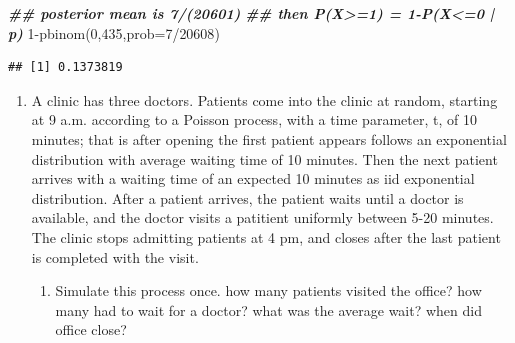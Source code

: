 \documentclass[
]{book}
\newenvironment{Shaded}{\begin{snugshade}}{\end{snugshade}}
\newcommand{\AttributeTok}[1]{\textcolor[rgb]{0.77,0.63,0.00}{#1}}
\newcommand{\DecValTok}[1]{\textcolor[rgb]{0.00,0.00,0.81}{#1}}
\newcommand{\DocumentationTok}[1]{\textcolor[rgb]{0.56,0.35,0.01}{\textbf{\textit{#1}}}}
\newcommand{\FunctionTok}[1]{\textcolor[rgb]{0.00,0.00,0.00}{#1}}
\newcommand{\NormalTok}[1]{#1}
\newcommand{\SpecialCharTok}[1]{\textcolor[rgb]{0.00,0.00,0.00}{#1}}
\providecommand{\tightlist}{%
  \setlength{\itemsep}{0pt}\setlength{\parskip}{0pt}}
\theoremstyle{definition}
\theoremstyle{definition}
\theoremstyle{definition}
\theoremstyle{definition}
\theoremstyle{remark}
\begin{document}
\begin{Shaded}
\begin{Highlighting}[]
 \DocumentationTok{\#\# posterior mean is 7/(20601)}
\DocumentationTok{\#\# then P(X\textgreater{}=1) = 1{-}P(X\textless{}=0 | p)}
  \DecValTok{1}\SpecialCharTok{{-}}\FunctionTok{pbinom}\NormalTok{(}\DecValTok{0}\NormalTok{,}\DecValTok{435}\NormalTok{,}\AttributeTok{prob=}\DecValTok{7}\SpecialCharTok{/}\DecValTok{20608}\NormalTok{)}
\end{Highlighting}
\end{Shaded}

\begin{verbatim}
## [1] 0.1373819
\end{verbatim}

\begin{enumerate}
\def\labelenumi{\arabic{enumi}.}
\setcounter{enumi}{8}
\item
  A clinic has three doctors. Patients come into the clinic at random, starting at 9 a.m. according to a Poisson process, with a time parameter, t, of 10 minutes; that is after opening the first patient appears follows an exponential distribution with average waiting time of 10 minutes. Then the next patient arrives with a waiting time of an expected 10 minutes as iid exponential distribution. After a patient arrives, the patient waits until a doctor is available, and the doctor visits a patitient uniformly between 5-20 minutes. The clinic stops admitting patients at 4 pm, and closes after the last patient is completed with the visit.

  \begin{enumerate}
  \def\labelenumii{(\alph{enumii})}
  \tightlist
  \item
    Simulate this process once. how many patients visited the office? how many had to wait for a doctor? what was the average wait? when did office close?
  \end{enumerate}
\end{enumerate}
\end{document}
